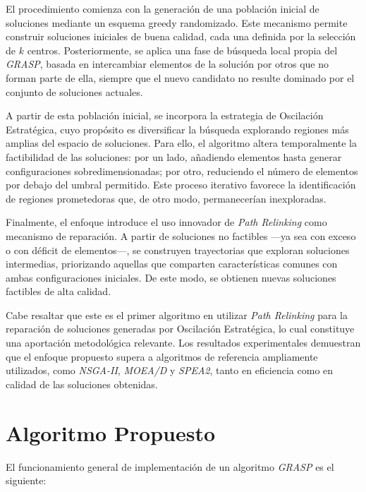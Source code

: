 \documentclass[12pt,a4paper]{book}
\begin{document}
El procedimiento comienza con la generación de una población inicial de soluciones mediante un esquema greedy randomizado. Este mecanismo permite construir soluciones iniciales de buena calidad, cada una definida por la selección de $k$ centros. Posteriormente, se aplica una fase de búsqueda local propia del \textit{GRASP}, basada en intercambiar elementos de la solución por otros que no forman parte de ella, siempre que el nuevo candidato no resulte dominado por el conjunto de soluciones actuales.

A partir de esta población inicial, se incorpora la estrategia de Oscilación Estratégica, cuyo propósito es diversificar la búsqueda explorando regiones más amplias del espacio de soluciones. Para ello, el algoritmo altera temporalmente la factibilidad de las soluciones: por un lado, añadiendo elementos hasta generar configuraciones sobredimensionadas; por otro, reduciendo el número de elementos por debajo del umbral permitido.
Este proceso iterativo favorece la identificación de regiones prometedoras que, de otro modo, permanecerían inexploradas.

Finalmente, el enfoque introduce el uso innovador de \emph{Path Relinking} como mecanismo de reparación. A partir de soluciones no factibles —ya sea con exceso o con déficit de elementos—, se construyen trayectorias que exploran soluciones intermedias, priorizando aquellas que comparten características comunes con ambas configuraciones iniciales. De este modo, se obtienen nuevas soluciones factibles de alta calidad.

Cabe resaltar que este es el primer algoritmo en utilizar \emph{Path Relinking} para la reparación de soluciones generadas por Oscilación Estratégica, lo cual constituye una aportación metodológica relevante. Los resultados experimentales demuestran que el enfoque propuesto supera a algoritmos de referencia ampliamente utilizados, como \textit{NSGA-II}, \textit{MOEA/D} y \textit{SPEA2}, tanto en eficiencia como en calidad de las soluciones obtenidas.

\section{Algoritmo Propuesto}
El funcionamiento general de implementación de un algoritmo \textit{GRASP} es el siguiente:
\end{document}
